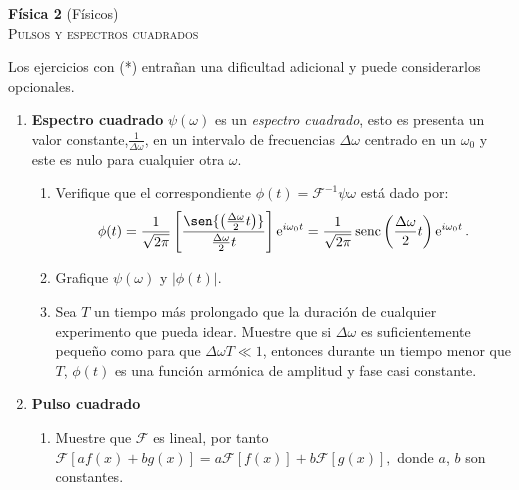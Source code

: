 \documentclass[11pt,spanish,a4paper]{article}
\begin{document}
\begin{center}
\textbf{Física 2} (Físicos) \hfill {}\\
	\textsc{\LARGE Pulsos y espectros cuadrados}
\end{center}

Los ejercicios con (*) entrañan una dificultad adicional y puede considerarlos opcionales.



\begin{enumerate}


\item
\textbf{Espectro cuadrado}
\(\psi(\omega)\) es un \emph{espectro cuadrado}, esto es presenta un valor constante,$\frac{1}{\Delta \omega}$, en un intervalo de frecuencias $\Delta\omega$ centrado en un $\omega_0$ y este es nulo para cualquier otra $\omega$.
\begin{enumerate}
	\item
	Verifique que el correspondiente $\phi(t) = \mathcal{F}^{-1} \psi{\omega}$ está dado por:
	$$
		\phi(t)
		= \frac{1}{\sqrt{2 \pi}} \left[ \frac{ \sen{ \left( \frac{\Delta \omega}{2} t \right) } }{\frac{\Delta \omega}{2} t} \right] \operatorname{e}^{i \omega_0 t}
		= \frac{1}{\sqrt{2 \pi}} \operatorname{senc} \left( \frac{\Delta \omega}{2} t \right) \operatorname{e}^{i \omega_0 t}.
	$$
	\item
	Grafique $\psi(\omega)$ y $\left|\phi(t)\right|$.
	\item 
	Sea $T$ un tiempo más prolongado que la duración de cualquier experimento que pueda idear.
	Muestre que si $\Delta\omega$ es suficientemente pequeño como para que $\Delta\omega T\ll1$, entonces durante un tiempo menor que $T$, $\phi(t)$ es una función armónica de amplitud y fase casi constante.
\end{enumerate}


\item \textbf{Pulso cuadrado}
\begin{enumerate}
	\item Muestre que $\mathcal{F}$ es lineal, por tanto
	$
	\mathcal{F} \left[ a f(x) + b g(x) \right] = a \mathcal{F} \left[ f(x) \right] + b \mathcal{F} \left[ g(x) \right],
	$
	donde $a$, $b$ son constantes.


\end{enumerate}
\end{enumerate}
\end{document}
